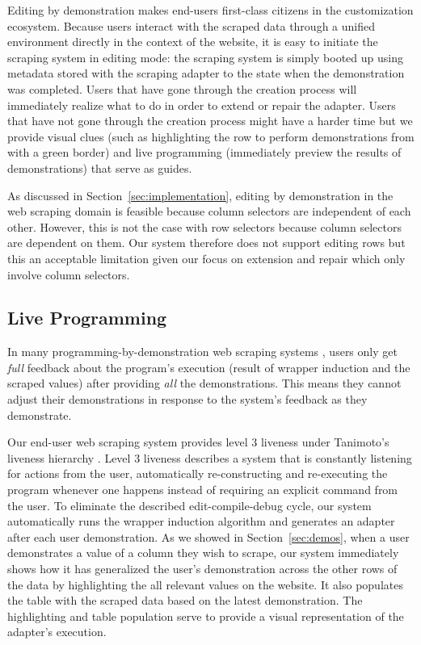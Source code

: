 \documentclass[sigconf,10pt]{acmart}
\begin{document}
Editing by demonstration makes end-users first-class citizens in the
customization ecosystem. Because users interact with the scraped data
through a unified environment directly in the context of the website, it
is easy to initiate the scraping system in editing mode: the scraping
system is simply booted up using metadata stored with the scraping
adapter to the state when the demonstration was completed. Users that
have gone through the creation process will immediately realize what to
do in order to extend or repair the adapter. Users that have not gone
through the creation process might have a harder time but we provide
visual clues (such as highlighting the row to perform demonstrations
from with a green border) and live programming (immediately preview the
results of demonstrations) that serve as guides.

As discussed in Section~\ref{sec:implementation}, editing by
demonstration in the web scraping domain is feasible because column
selectors are independent of each other. However, this is not the case
with row selectors because column selectors are dependent on them. Our
system therefore does not support editing rows but this an acceptable
limitation given our focus on extension and repair which only involve
column selectors.

\hypertarget{live-programming-1}{%
\subsection{Live Programming}\label{live-programming-1}}

In many programming-by-demonstration web scraping systems
\citep{chasins2018, lin2009}, users only get \emph{full} feedback about
the program's execution (result of wrapper induction and the scraped
values) after providing \emph{all} the demonstrations. This means they
cannot adjust their demonstrations in response to the system's feedback
as they demonstrate.

Our end-user web scraping system provides level 3 liveness under
Tanimoto's liveness hierarchy \citep{tanimoto1990}. Level 3 liveness
describes a system that is constantly listening for actions from the
user, automatically re-constructing and re-executing the program
whenever one happens instead of requiring an explicit command from the
user. To eliminate the described edit-compile-debug cycle, our system
automatically runs the wrapper induction algorithm and generates an
adapter after each user demonstration. As we showed in
Section~\ref{sec:demos}, when a user demonstrates a value of a column
they wish to scrape, our system immediately shows how it has generalized
the user's demonstration across the other rows of the data by
highlighting the all relevant values on the website. It also populates
the table with the scraped data based on the latest demonstration. The
highlighting and table population serve to provide a visual
representation of the adapter's execution.
\end{document}
